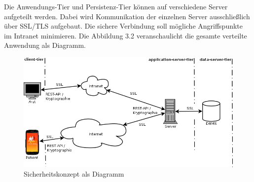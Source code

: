 Die Anwendungs-Tier und Persistenz-Tier k\"onnen auf verschiedene Server aufgeteilt werden. 
Dabei wird Kommunikation der einzelnen Server ausschlie\ss{}lich \"uber SSL/TLS aufgebaut.
Die sichere Verbindung soll m\"ogliche Angriffspunkte im Intranet minimieren.
Die Abbildung 3.2 veranschaulicht die gesamte verteilte Anwendung als Diagramm.\\

\begin{figure}[h]
  \centering
  \includegraphics[scale=0.5]{diagramme/kapitel3/gesammt_system.png}
  \caption{Sicherheitskonzept als Diagramm}
 
\end{figure}






